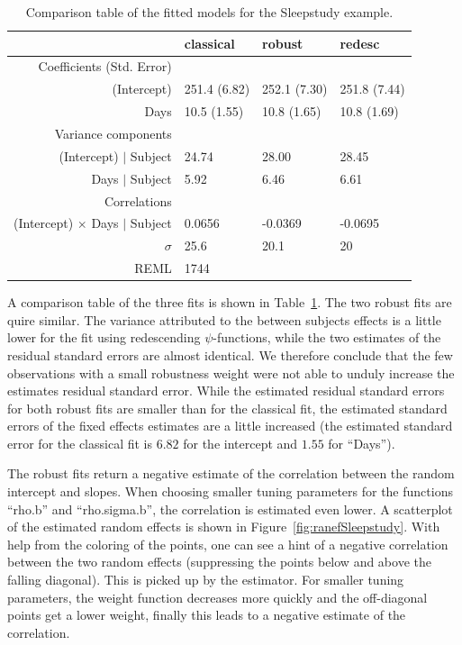 \documentclass[11pt, a4paper]{article}
\theoremstyle{note}
\begin{document}
\begin{table}[ht]
\centering
{\small
\begin{tabular}{rlll}
  \hline
  & classical & robust & redesc \\ 
  \hline
Coefficients (Std. Error) &  &  &  \\ 
  (Intercept) & 251.4 (6.82) & 252.1 (7.30) & 251.8 (7.44) \\ 
  Days &  10.5 (1.55) &  10.8 (1.65) &  10.8 (1.69) \\ 
   \hline
Variance components &  &  &  \\ 
  (Intercept) $|$ Subject & 24.74 & 28.00 & 28.45 \\ 
  Days $|$ Subject &  5.92 &  6.46 &  6.61 \\ 
   \hline
Correlations &  &  &  \\ 
  (Intercept) $\times$ Days $|$ Subject &  0.0656 & -0.0369 & -0.0695 \\ 
   \hline
$\sigma$ & 25.6 & 20.1 & 20 \\ 
   \hline
REML & 1744 &  &  \\ 
   \hline
\end{tabular}
}
\caption{Comparison table of the fitted models for the Sleepstudy example.} 
\label{tab:cmpSleepstudy}
\end{table}
A comparison table of the three fits is shown in
Table~\ref{tab:cmpSleepstudy}. The two robust fits are quire similar. The
variance attributed to the between subjects effects is a little lower for
the fit using redescending $\psi$-functions, while the two estimates of the
residual standard errors are almost identical. We therefore conclude that
the few observations with a small robustness weight were not able to unduly
increase the estimates residual standard error.  While the estimated
residual standard errors for both robust fits are smaller than for the
classical fit, the estimated standard errors of the fixed effects estimates
are a little increased (the estimated standard error for the classical fit
is $6.82$ for the intercept and
$1.55$ for ``Days'').

The robust fits return a negative estimate of the correlation between the
random intercept and slopes. When choosing smaller tuning parameters for
the functions ``rho.b'' and ``rho.sigma.b'', the correlation is estimated
even lower. A scatterplot of the estimated random effects is shown in
Figure~\ref{fig:ranefSleepstudy}. With help from the coloring of the
points, one can see a hint of a negative correlation between the two random
effects (suppressing the points below and above the falling diagonal). This
is picked up by the estimator. For smaller tuning parameters, the weight
function decreases more quickly and the off-diagonal points get a lower
weight, finally this leads to a negative estimate of the correlation.
\end{document}
